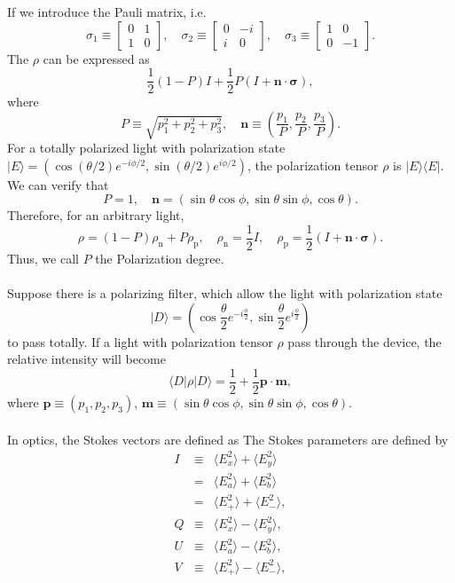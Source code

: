 If we introduce the Pauli matrix, i.e.
\[\sigma_1 \equiv \left[ \begin{matrix} 0& 1\\ 1& 0\end{matrix} \right] , \quad \sigma_2 \equiv \left[ \begin{matrix} 0& - i\\ i& 0\end{matrix} \right] , \quad \sigma_3 \equiv \left[ \begin{matrix} 1& 0\\ 0& -1\end{matrix} \right] .\]
The $\rho$ can be expressed as
\[\frac{1}{2} (1-P) I + \frac{1}{2} P(I + \bm{n} \cdot \bm{\sigma}),\]
where
\[P \equiv \sqrt{p_1^2 + p_2^2 + p_3^2} , \quad \bm{n} \equiv (\frac{p_1}{P},\frac{p_2}{P},\frac{p_3}{P}).\]
For a totally polarized light with polarization state$ | E\rangle = (\cos ({\theta}/{2}) e^{-i{\phi}/{2}} , \sin ({\theta}/{2}) e^{i{\phi}/{2}})$, the polarization tensor $\rho$ is $|E\rangle \langle E|$. We can verify that
\[P = 1 , \quad \bm{n} = (\sin\theta \cos\phi, \sin\theta \sin\phi, \cos \theta).\]
Therefore, for an arbitrary light,
\[\rho = (1-P)\rho_{\mathrm{n}} + P \rho_{\mathrm{p}} , \quad \rho_{\mathrm{n}} = \frac{1}{2}I , \quad \rho_{\mathrm{p}} = \frac{1}{2}(I + \bm{n} \cdot \bm{\sigma}).\]
Thus, we call $P$ the Polarization degree. \\ \\
Suppose there is a polarizing filter,  which allow the light with polarization state
\[| D \rangle = \left(\cos \frac{\theta}{2} e^{-i\frac{\phi}{2}} , \sin \frac{\theta}{2} e^{i\frac{\phi}{2}}\right)\]
to pass totally. If a light with polarization tensor $\rho$ pass through the device, the relative intensity will become
\[\langle D | \rho | D \rangle = \frac{1}{2} + \frac{1}{2} \bm{p} \cdot \bm{m},\]
where $\bm{p} \equiv (p_1,p_2,p_3)$, $\bm{m} \equiv (\sin\theta \cos\phi, \sin\theta \sin\phi, \cos \theta)$.
\\ \\
In optics, the Stokes vectors are defined as
The Stokes parameters are defined by
\begin{eqnarray}
I&\equiv& \langle E_{x}^{2}\rangle +\langle E_{y}^{2}\rangle \nonumber \\
&=& \langle E_{a}^{2}\rangle +\langle E_{b}^{2}\rangle \nonumber \\
&=& \langle E_{+}^{2}\rangle +\langle E_{-}^{2}\rangle, \nonumber \\
Q&\equiv& \langle E_{x}^{2}\rangle -\langle E_{y}^{2}\rangle, \nonumber \\
U&\equiv& \langle E_{a}^{2}\rangle -\langle E_{b}^{2}\rangle, \nonumber \\
V&\equiv& \langle E_{+}^{2}\rangle -\langle E_{-}^{2}\rangle, \nonumber
\end{eqnarray}
